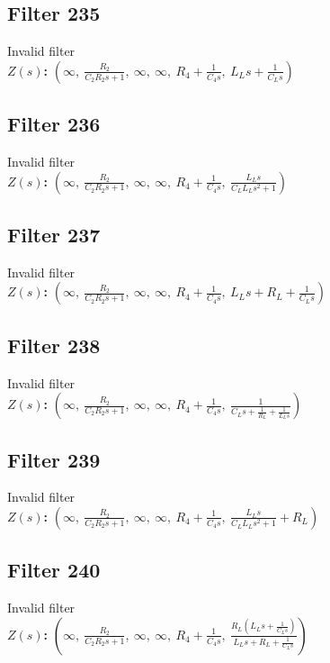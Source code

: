\documentclass{article}
\begin{document}
\subsection*{Filter 235}
Invalid filter \\ 
\textbf{$Z(s)$:} $\left( \infty, \  \frac{R_{2}}{C_{2} R_{2} s + 1}, \  \infty, \  \infty, \  R_{4} + \frac{1}{C_{4} s}, \  L_{L} s + \frac{1}{C_{L} s}\right)$ \\ 
\subsection*{Filter 236}
Invalid filter \\ 
\textbf{$Z(s)$:} $\left( \infty, \  \frac{R_{2}}{C_{2} R_{2} s + 1}, \  \infty, \  \infty, \  R_{4} + \frac{1}{C_{4} s}, \  \frac{L_{L} s}{C_{L} L_{L} s^{2} + 1}\right)$ \\ 
\subsection*{Filter 237}
Invalid filter \\ 
\textbf{$Z(s)$:} $\left( \infty, \  \frac{R_{2}}{C_{2} R_{2} s + 1}, \  \infty, \  \infty, \  R_{4} + \frac{1}{C_{4} s}, \  L_{L} s + R_{L} + \frac{1}{C_{L} s}\right)$ \\ 
\subsection*{Filter 238}
Invalid filter \\ 
\textbf{$Z(s)$:} $\left( \infty, \  \frac{R_{2}}{C_{2} R_{2} s + 1}, \  \infty, \  \infty, \  R_{4} + \frac{1}{C_{4} s}, \  \frac{1}{C_{L} s + \frac{1}{R_{L}} + \frac{1}{L_{L} s}}\right)$ \\ 
\subsection*{Filter 239}
Invalid filter \\ 
\textbf{$Z(s)$:} $\left( \infty, \  \frac{R_{2}}{C_{2} R_{2} s + 1}, \  \infty, \  \infty, \  R_{4} + \frac{1}{C_{4} s}, \  \frac{L_{L} s}{C_{L} L_{L} s^{2} + 1} + R_{L}\right)$ \\ 
\subsection*{Filter 240}
Invalid filter \\ 
\textbf{$Z(s)$:} $\left( \infty, \  \frac{R_{2}}{C_{2} R_{2} s + 1}, \  \infty, \  \infty, \  R_{4} + \frac{1}{C_{4} s}, \  \frac{R_{L} \left(L_{L} s + \frac{1}{C_{L} s}\right)}{L_{L} s + R_{L} + \frac{1}{C_{L} s}}\right)$ \\ 
\end{document}

